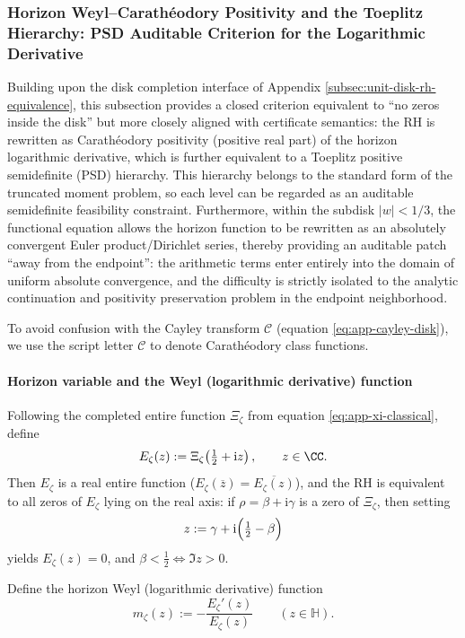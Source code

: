 \subsubsection{Horizon Weyl--Carath\'eodory Positivity and the Toeplitz Hierarchy: PSD Auditable Criterion for the Logarithmic Derivative}\label{subsubsec:app-horizon-weyl-carath-toeplitz}
Building upon the disk completion interface of Appendix \ref{subsec:unit-disk-rh-equivalence}, this subsection provides a closed criterion equivalent to ``no zeros inside the disk'' but more closely aligned with certificate semantics: the RH is rewritten as Carath\'eodory positivity (positive real part) of the horizon logarithmic derivative, which is further equivalent to a Toeplitz positive semidefinite (PSD) hierarchy.
This hierarchy belongs to the standard form of the truncated moment problem, so each level can be regarded as an auditable semidefinite feasibility constraint.
Furthermore, within the subdisk \(|w|<1/3\), the functional equation allows the horizon function to be rewritten as an absolutely convergent Euler product/Dirichlet series, thereby providing an auditable patch ``away from the endpoint'': the arithmetic terms enter entirely into the domain of uniform absolute convergence, and the difficulty is strictly isolated to the analytic continuation and positivity preservation problem in the endpoint neighborhood.
\par
To avoid confusion with the Cayley transform \(\mathcal{C}\) (equation \eqref{eq:app-cayley-disk}), we use the script letter \(\mathscr{C}\) to denote Carath\'eodory class functions.

\paragraph{Horizon variable and the Weyl (logarithmic derivative) function}
Following the completed entire function \(\Xi_{\zeta}\) from equation \eqref{eq:app-xi-classical}, define
\[
E_{\zeta}(z):=\Xi_{\zeta}\!\left(\tfrac12+\mathrm{i}z\right),\qquad z\in\CC .
\]
Then \(E_{\zeta}\) is a real entire function (\(E_{\zeta}(\overline z)=\overline{E_{\zeta}(z)}\)), and the RH is equivalent to all zeros of \(E_{\zeta}\) lying on the real axis: if \(\rho=\beta+\mathrm{i}\gamma\) is a zero of \(\Xi_{\zeta}\), then setting
\[
z:=\gamma+\mathrm{i}\Bigl(\tfrac12-\beta\Bigr)
\]
yields \(E_{\zeta}(z)=0\), and \(\beta<\tfrac12 \iff \Im z>0\).

Define the horizon Weyl (logarithmic derivative) function
\[
m_{\zeta}(z):=-\frac{E_{\zeta}'(z)}{E_{\zeta}(z)}\qquad(z\in\mathbb{H}).
\]

